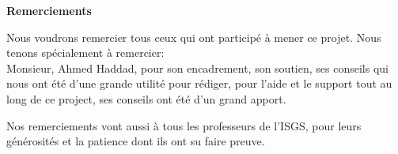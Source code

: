 \thispagestyle{empty}
\begin{center}
	\LARGE\textbf{Remerciements}
\end{center}
\vspace{0.5cm}
\large
\noindent
Nous voudrons remercier tous ceux qui ont participé à mener ce projet. Nous tenons spécialement à remercier: \\

\noindent
Monsieur, Ahmed Haddad, pour son encadrement, son soutien, ses conseils qui nous ont été d'une grande utilité pour rédiger, pour l'aide et le support tout au long de ce project, ses conseils ont été d'un grand apport.

\vspace{0.5cm}
\noindent
Nos remerciements vont aussi à tous les professeurs de l'ISGS, pour leurs générosités et la patience dont ils ont su faire preuve.

\newpage